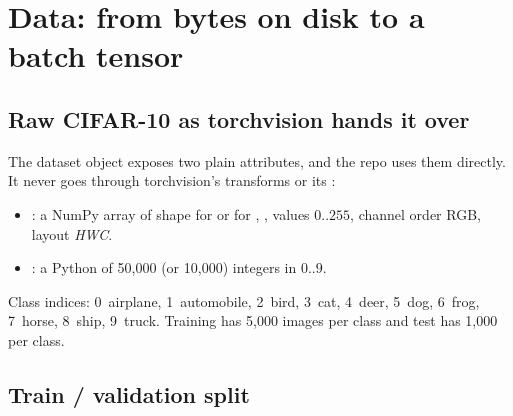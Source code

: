 \section{Data: from bytes on disk to a batch tensor}
\label{sec:data}

\subsection{Raw CIFAR-10 as torchvision hands it over}

\begin{repo}[\texttt{torchvision.datasets.CIFAR10(root="data", train=..., download=True)}]
The dataset object exposes two plain attributes, and the repo uses them directly. It never goes through torchvision's transforms or its :
\begin{itemize}[nosep]
  \item {}: a NumPy array of shape  for  or  for , , values $0..255$, channel order RGB, layout \emph{HWC}.
  \item {}: a Python  of 50{,}000 (or 10{,}000) integers in $0..9$.
\end{itemize}
Class indices: 0~airplane, 1~automobile, 2~bird, 3~cat, 4~deer, 5~dog, 6~frog, 7~horse, 8~ship, 9~truck. Training has 5{,}000 images per class and test has 1{,}000 per class.
\end{repo}

\begin{center}
\end{center}

\subsection{Train / validation split}

